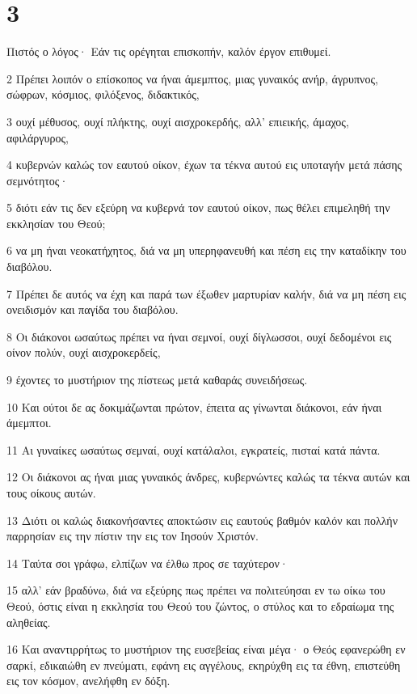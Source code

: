 \chapter{3}

\par Πιστός ο λόγος· Εάν τις ορέγηται επισκοπήν, καλόν έργον επιθυμεί.
\par 2 Πρέπει λοιπόν ο επίσκοπος να ήναι άμεμπτος, μιας γυναικός ανήρ, άγρυπνος, σώφρων, κόσμιος, φιλόξενος, διδακτικός,
\par 3 ουχί μέθυσος, ουχί πλήκτης, ουχί αισχροκερδής, αλλ' επιεικής, άμαχος, αφιλάργυρος,
\par 4 κυβερνών καλώς τον εαυτού οίκον, έχων τα τέκνα αυτού εις υποταγήν μετά πάσης σεμνότητος·
\par 5 διότι εάν τις δεν εξεύρη να κυβερνά τον εαυτού οίκον, πως θέλει επιμεληθή την εκκλησίαν του Θεού;
\par 6 να μη ήναι νεοκατήχητος, διά να μη υπερηφανευθή και πέση εις την καταδίκην του διαβόλου.
\par 7 Πρέπει δε αυτός να έχη και παρά των έξωθεν μαρτυρίαν καλήν, διά να μη πέση εις ονειδισμόν και παγίδα του διαβόλου.
\par 8 Οι διάκονοι ωσαύτως πρέπει να ήναι σεμνοί, ουχί δίγλωσσοι, ουχί δεδομένοι εις οίνον πολύν, ουχί αισχροκερδείς,
\par 9 έχοντες το μυστήριον της πίστεως μετά καθαράς συνειδήσεως.
\par 10 Και ούτοι δε ας δοκιμάζωνται πρώτον, έπειτα ας γίνωνται διάκονοι, εάν ήναι άμεμπτοι.
\par 11 Αι γυναίκες ωσαύτως σεμναί, ουχί κατάλαλοι, εγκρατείς, πισταί κατά πάντα.
\par 12 Οι διάκονοι ας ήναι μιας γυναικός άνδρες, κυβερνώντες καλώς τα τέκνα αυτών και τους οίκους αυτών.
\par 13 Διότι οι καλώς διακονήσαντες αποκτώσιν εις εαυτούς βαθμόν καλόν και πολλήν παρρησίαν εις την πίστιν την εις τον Ιησούν Χριστόν.
\par 14 Ταύτα σοι γράφω, ελπίζων να έλθω προς σε ταχύτερον·
\par 15 αλλ' εάν βραδύνω, διά να εξεύρης πως πρέπει να πολιτεύησαι εν τω οίκω του Θεού, όστις είναι η εκκλησία του Θεού του ζώντος, ο στύλος και το εδραίωμα της αληθείας.
\par 16 Και αναντιρρήτως το μυστήριον της ευσεβείας είναι μέγα· ο Θεός εφανερώθη εν σαρκί, εδικαιώθη εν πνεύματι, εφάνη εις αγγέλους, εκηρύχθη εις τα έθνη, επιστεύθη εις τον κόσμον, ανελήφθη εν δόξη.

